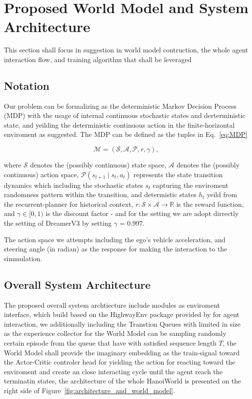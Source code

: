 \section{Proposed World Model and System Architecture}
\label{sec:architecture}

This section shall focus in suggestion in world model contruction, the whole agent interaction flow, and training algorithm that shall be leveraged

\subsection{Notation}
Our problem can be formalizing as the deterministic Markov Decision Process (MDP) with the usage of internal continuous stochastic states and derterministic state, and yeilding the deterministic continuous action in the finite-horizontal enviroment as \cite{sun_2022_supervised, Hafner2023} suggested. The MDP can be defined as the tuples in Eq.~\eqref{eq:MDP}

\begin{equation}
\label{eq:MDP}
\mathcal{M} = (\mathcal{S}, \mathcal{A}, \mathcal{P}, r, \gamma),
\end{equation}

where $\mathcal{S}$ denotes the (possibly continuous) state space, 
$\mathcal{A}$ denotes the (possibly continuous) action space, 
$\mathcal{P}(s_{t+1} \mid s_t, a_t)$ represents the state transition dynamics which including the stochastic states $s_t$ capturing the enviroment randomness pattern within the transition, and determistic states $h_t$ yeild from the recurrent-planner for historical context,
$r : \mathcal{S} \times \mathcal{A} \rightarrow \mathbb{R}$ is the reward function,
and $\gamma \in [0,1)$ is the discount factor - and for the setting we are adopt dirrectly the setting of DreamerV3 by setting  $\gamma$ = 0.997.

The action space we attempts including the ego's vehicle acceleration, and steering angle (in radian) as the response for making the interaction to the simmulation.

\subsection{Overall System Architecture}
The proposed overall system archtiecture include modules as enviroment interface, which build based on the HighwayEnv package provided by \cite{faramafoundation_2025_gymnasium} for agent interaction, we additionally including the Transtion Queues with limited in size as the experience collector for the World Model can be sampling randomly certain episode from the queue that have with satisfied sequence length $T$, the World Model shall provide the imaginary embedding as the train-signal toward the Actor-Critic controler head for yielding the action for reacting toward the enviroment and create an close interacting cycle until the agent reach the terminatin states, the architecture of the whole HanoiWorld is presented on the right side of Figure~\ref{fig:architecture_and_world_model}.
    
